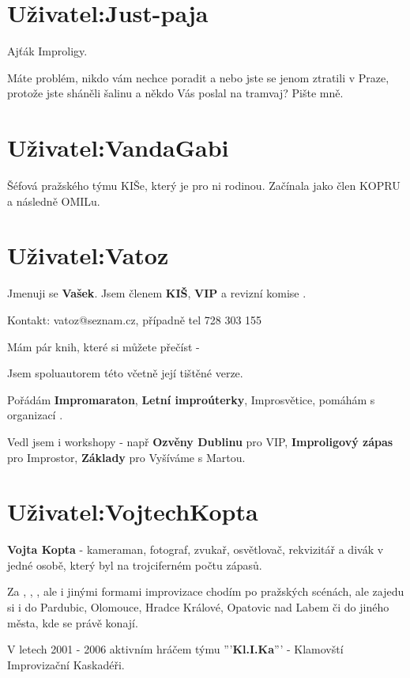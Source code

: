 \needspace{5cm} \section{Uživatel:Just-paja} \label{uživatel:just-paja} Ajťák Improligy. 
 
Máte problém, nikdo vám nechce poradit a nebo jste se jenom ztratili v Praze, protože jste sháněli šalinu a někdo Vás poslal na tramvaj? Pište mně. 
\needspace{5cm} \section{Uživatel:VandaGabi} \label{uživatel:vandagabi} Šéfová pražského týmu KIŠe, který je pro ni rodinou. Začínala jako člen KOPRU a následně OMILu. 
\needspace{5cm} \section{Uživatel:Vatoz} \label{uživatel:vatoz} Jmenuji se \textbf{Vašek}{}. 
Jsem členem \textbf{KIŠ}{}, \textbf{VIP}{} a revizní komise . 
 
Kontakt:   vatoz@seznam.cz, případně tel 728 303 155 
 
Mám pár knih, které si můžete přečíst -  
 
Jsem spoluautorem této  včetně její tištěné verze. 
 
Pořádám \textbf{Impromaraton}, \textbf{Letní improúterky}, Improsvětice, pomáhám s organizací . 
 
Vedl jsem i workshopy  - např  \textbf{Ozvěny Dublinu}{} pro VIP, \textbf{Improligový zápas}{} pro  Improstor, \textbf{Základy}{} pro Vyšíváme s Martou. 
\needspace{5cm} \section{Uživatel:VojtechKopta} \label{uživatel:vojtechkopta} \textbf{Vojta Kopta}{} - kameraman, fotograf, zvukař, osvětlovač, rekvizitář a divák v jedné osobě, který byl na trojciferném počtu zápasů.  
 
Za , , , ale i jinými formami improvizace chodím po pražských scénách, ale zajedu si i do Pardubic, Olomouce, Hradce Králové, Opatovic nad Labem či do jiného města, kde se právě konají. 
 
V letech 2001 - 2006 aktivním hráčem týmu '''\textbf{Kl.I.Ka}''' - Klamovští Improvizační Kaskadéři. 

